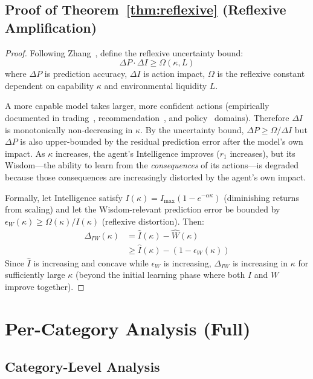 \documentclass{article}
\begin{document}
\subsection{Proof of Theorem~\ref{thm:reflexive} (Reflexive Amplification)}
\begin{proof}
Following Zhang~\cite{reflexive_intelligence}, define the reflexive
uncertainty bound:
\begin{equation}
  \Delta P \cdot \Delta I \geq \Omega(\kappa, L)
\end{equation}
where $\Delta P$ is prediction accuracy, $\Delta I$ is action impact,
$\Omega$ is the reflexive constant dependent on capability $\kappa$
and environmental liquidity $L$.

A more capable model takes larger, more confident actions
(empirically documented in trading~\cite{reflexive_intelligence},
recommendation~\cite{rec_feedback}, and policy~\cite{lucas1976}
domains). Therefore $\Delta I$ is monotonically non-decreasing in
$\kappa$. By the uncertainty bound, $\Delta P \geq \Omega / \Delta I$
but $\Delta P$ is also upper-bounded by the residual prediction
error after the model's own impact. As $\kappa$ increases, the
agent's Intelligence improves ($r_1$ increases), but its Wisdom---the
ability to learn from the \emph{consequences} of its actions---is
degraded because those consequences are increasingly distorted by
the agent's own impact.

Formally, let Intelligence satisfy $I(\kappa) = I_{\max}(1 - e^{-\alpha\kappa})$
(diminishing returns from scaling) and let the Wisdom-relevant prediction
error be bounded by $\epsilon_W(\kappa) \geq \Omega(\kappa) / I(\kappa)$
(reflexive distortion). Then:
\begin{align}
  \Delta_{IW}(\kappa) &= \hat{I}(\kappa) - \hat{W}(\kappa) \\
  &\geq \hat{I}(\kappa) - (1 - \epsilon_W(\kappa))
\end{align}
Since $\hat{I}$ is increasing and concave while $\epsilon_W$ is
increasing, $\Delta_{IW}$ is increasing in $\kappa$ for sufficiently
large $\kappa$ (beyond the initial learning phase where both $I$ and
$W$ improve together).
\end{proof}
\section{Per-Category Analysis (Full)}
\label{app:category}
\subsection{Category-Level Analysis}
\end{document}
